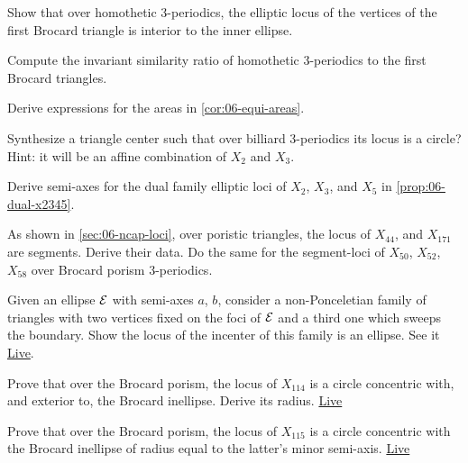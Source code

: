 \begin{exercise}
Show that over homothetic 3-periodics, the elliptic locus of the vertices of the first Brocard triangle is interior to the inner ellipse.
\end{exercise}

\begin{exercise}
Compute the invariant similarity ratio of homothetic 3-periodics to the first Brocard triangles. 
\end{exercise}

\begin{exercise}
Derive expressions for the areas in \cref{cor:06-equi-areas}.
\end{exercise}

\begin{exercise}
Synthesize a triangle center such that over billiard 3-periodics its locus is a circle? Hint: it will be an affine combination of $X_2$ and $X_3$.
\end{exercise}

\begin{exercise}
Derive semi-axes for the dual family elliptic loci of $X_2$, $X_3$, and $X_5$ in \cref{prop:06-dual-x2345}.
\end{exercise}

\begin{exercise}
As shown in \cref{sec:06-ncap-loci}, over poristic triangles, the locus of $X_{44}$, and $X_{171}$ are segments. Derive their data. Do the same for the segment-loci of $X_{50}$, $X_{52}$, $X_{58}$ over Brocard porism 3-periodics.
\end{exercise}

\begin{exercise}
Given an ellipse $\mathcal{E}$ with semi-axes $a$, $b$, consider a non-Ponceletian family of triangles with two vertices fixed on the foci of $\mathcal{E}$ and a third one which sweeps the boundary. Show the locus of the incenter of this family is an ellipse. See it \href{https://bit.ly/3up4a6V}{Live}.
\end{exercise}

\begin{exercise}
Prove that over the Brocard porism, the locus of $X_{114}$ is a circle concentric with, and exterior to, the Brocard inellipse. Derive its radius. \href{https://bit.ly/3g6pmcv}{Live}
\end{exercise}

\begin{exercise}
Prove that over the Brocard porism, the locus of $X_{115}$ is a circle concentric with the Brocard inellipse of radius equal to the latter's minor semi-axis. \href{https://bit.ly/3pfR5Mc}{Live}
\end{exercise}

